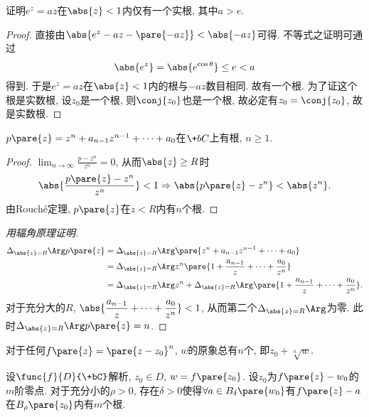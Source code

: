 \documentclass{ctexart}
\begin{document}
\begin{sample}
    \begin{ex}
        证明$e^z = az$在$\abs{z} < 1$内仅有一个实根, 其中$a > e$.
    \end{ex}
    \begin{proof}
        直接由$\abs{e^z - az - \pare{-az}} < \abs{-az}$可得. 不等式之证明可通过
        \[ \abs{e^z} = \abs{e^{\cos\theta}} \le e < a \]
        得到. 于是$e^z = az$在$\abs{z} < 1$内的根与$-az$数目相同. 故有一个根. 为了证这个根是实数根, 设$z_0$是一个根, 则$\conj{z_0}$也是一个根, 故必定有$z_0 = \conj{z_0}$, 故是实数根.
    \end{proof}
\end{sample}
\begin{sample}
    \begin{ex}
        $p\pare{z} = z^n + a_{n-1}z^{n-1} + \cdots + a_0$在$\+bC$上有根, $n\ge 1$.
    \end{ex}
    \begin{proof}
        $\displaystyle \lim_{n\rightarrow \infty} \frac{p-z^n}{z^n} = 0$, 从而$\abs{z}\ge R$时
        \[ \abs{\frac{p\pare{z} - z^n}{z^n}} < 1 \Rightarrow \abs{p\pare{z} - z^n} < \abs{z^n}. \]
        由Rouch\'e定理, $p\pare{z}$在$z<R$内有$n$个根.
    \end{proof}
    \begin{proof}[用辐角原理证明]
        \begin{align*}
            \Delta_{\abs{z} = R} \Arg p\pare{z} &= \Delta_{\abs{z} = R} \Arg \pare{z^n + a_{n-1}z^{n-1}+\cdots + a_0} \\
            &= \Delta_{\abs{z} = R} \Arg z^n \pare{1 + \frac{a_{n-1}}{z}+\cdots + \frac{a_0}{z^n}} \\
            &= \Delta_{\abs{z} = R} \Arg z^n + \Delta_{\abs{z} = R} \Arg \pare{1 + \frac{a_{n-1}}{z}+\cdots + \frac{a_0}{z^n}}.
        \end{align*}
        对于充分大的$R$, $\displaystyle \abs{\frac{a_{n-1}}{z}+\cdots + \frac{a_0}{z^n}} < 1$, 从而第二个$\Delta_{\abs{z}=R}\Arg$为零. 此时$\Delta_{\abs{z} = R} \Arg p\pare{z} = n$.
    \end{proof}
\end{sample}
\begin{ex}
    对于任何$f\pare{z} = \pare{z-z_0}^n$, $w$的原象总有$n$个, 即$z_0 + \sqrt[n]{w}$.
\end{ex}
\begin{figure}
    \centering
\end{figure}
\begin{theorem}
    \label{thm:多重解}
    设$\func{f}{D}{\+bC}$解析, $z_0 \in D$, $w = f\pare{z_0}$. 设$z_0$为$f\pare{z} - w_0$的$m$阶零点. 对于充分小的$\rho > 0$, 存在$\delta>0$使得$\forall a\in B_\delta\pare{w_0}$有$f\pare{z} - a$在$B_\rho\pare{z_0}$内有$m$个根.
\end{theorem}
\end{document}
